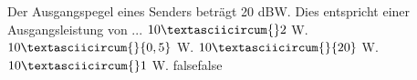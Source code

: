     {Der Ausgangspegel eines Senders beträgt 20 dBW. Dies entspricht einer Ausgangsleistung von ...}
    {$10\textasciicircum{}2$ W.}
    {$10\textasciicircum{}\{0,5\}$ W.}
    {$10\textasciicircum{}\{20\}$ W.}
    {$10\textasciicircum{}1$ W.}
    {false}{false}